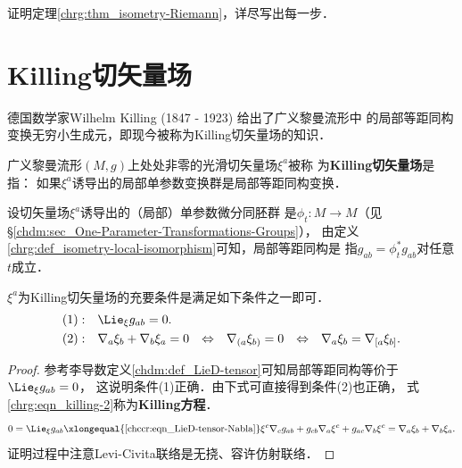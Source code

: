 \begin{exercise}
	证明定理\ref{chrg:thm_isometry-Riemann}，详尽写出每一步．
\end{exercise}



\section{Killing切矢量场}\label{chrg:sec_killing}
德国数学家Wilhelm Killing (1847 - 1923) 给出了广义黎曼流形中
的局部等距同构变换无穷小生成元，即现今被称为{Killing切矢量场}的知识．

\begin{definition}\label{chrg:def_killing}
    广义黎曼流形$(M,g)$上处处非零的光滑切矢量场$\xi^a$被称
    为{\bfseries \heiti Killing切矢量场}是指：
    如果$\xi^a$诱导出的局部单参数变换群是局部等距同构变换．
\end{definition}
设切矢量场$\xi^a$诱导出的（局部）单参数微分同胚群
是$\phi_{t}:M\to M$（见\S\ref{chdm:sec_One-Parameter-Transformations-Groups}），
由定义\ref{chrg:def_isometry-local-isomorphism}可知，局部等距同构是
指$g_{ab}=\phi_t^{*}g_{ab}$对任意$t$成立．

\begin{theorem}\label{chrg:thm_killing}
    $\xi^a$为Killing切矢量场的充要条件是满足如下条件之一即可．
    \begin{align}
        { (1)}:&\quad \Lie_{\xi} g_{ab} =0. \label{chrg:eqn_killing-1} \\
        { (2)}:&\quad \nabla_a \xi_b + \nabla_b \xi_a =0   {\quad \Leftrightarrow \quad}
        \nabla_{(a}\xi_{b)} =0   {\quad \Leftrightarrow \quad}
        \nabla_{a}\xi_{b} =\nabla_{[a}\xi_{b]}. \label{chrg:eqn_killing-2} 
    \end{align}
\end{theorem}
\begin{proof}
    参考李导数定义\eqref{chdm:def_LieD-tensor}可知局部等距同构等价于$\Lie_{\xi} g_{ab} =0$，
    这说明条件(1)正确．由下式可直接得到条件(2)也正确，
    式\eqref{chrg:eqn_killing-2}称为{\bfseries \heiti Killing方程}．
    \begin{equation*}
        0=\Lie_{\xi} g_{ab}\xlongequal{\ref{chccr:eqn_LieD-tensor-Nabla}} \xi^c \nabla_c g_{ab}+
         g_{cb} \nabla_a \xi^c + g_{ac} \nabla_b \xi^c = \nabla_a \xi_b + \nabla_b \xi_a .
    \end{equation*}
    证明过程中注意Levi-Civita联络是无挠、容许仿射联络．
\end{proof}

